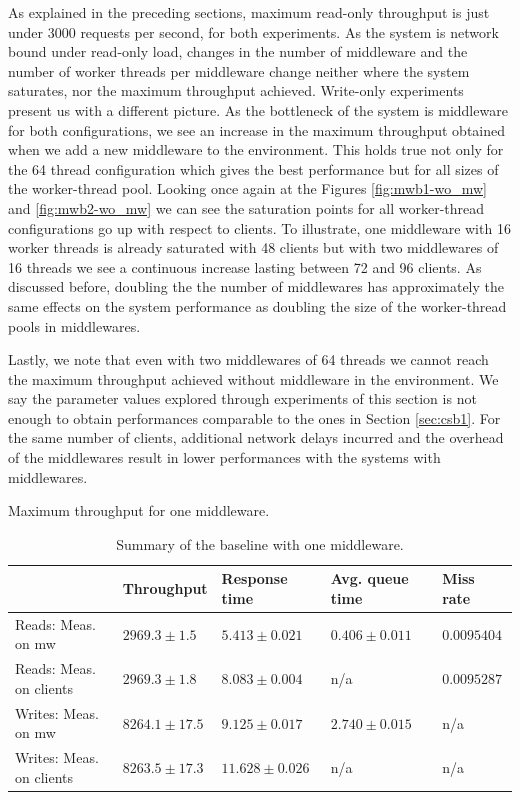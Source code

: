 \documentclass[11pt,a4paper]{article}
\begin{document}
\par As explained in the preceding sections, maximum read-only throughput is just under 3000 requests per second, for both experiments. As the system is network bound under read-only load, changes in the number of middleware and the number of worker threads per middleware change neither where the system saturates, nor the maximum throughput achieved. Write-only experiments present us with a different picture. As the bottleneck of the system is middleware for both configurations, we see an increase in the maximum throughput obtained when we add a new middleware to the environment. This holds true not only for the 64 thread configuration which gives the best performance but for all sizes of the worker-thread pool. Looking once again at the Figures \ref{fig:mwb1-wo_mw} and \ref{fig:mwb2-wo_mw} we can see the saturation points for all worker-thread configurations go up with respect to clients. To illustrate, one middleware with 16 worker threads is already saturated with 48 clients but with two middlewares of 16 threads we see a continuous increase lasting between 72 and 96 clients. As discussed before, doubling the the number of middlewares has approximately the same effects on the system performance as doubling the size of the worker-thread pools in middlewares.
\par Lastly, we note that even with two middlewares of 64 threads we cannot reach the maximum throughput achieved without middleware in the environment. We say the parameter values explored through experiments of this section is not enough to obtain performances comparable to the ones in Section \ref{sec:csb1}. For the same number of clients, additional network delays incurred and the overhead of the middlewares result in lower performances with the systems with middlewares.

\begin{table}[h]
\centering
{Maximum throughput for one middleware.}
\begin{tabular}{|l|p{2.3cm}|p{2.3cm}|p{2.7cm}|p{2.3cm}|}
\hline                       & Throughput        & {\small Response time}      & {\small Avg. queue time} & Miss rate \\ 
\hline Reads: Meas. on mw       & $2969.3 \pm 1.5$  & $5.413 \pm 0.021$  & $0.406 \pm 0.011$  & $0.0095404$ \\ 
\hline Reads: Meas. on clients  & $2969.3 \pm 1.8$  & $8.083 \pm 0.004$  & n/a                & $0.0095287$ \\ 
\hline Writes: Meas. on mw      & $8264.1 \pm 17.5$ & $9.125 \pm 0.017$  & $2.740 \pm 0.015$  & n/a \\ 
\hline Writes: Meas. on clients & $8263.5 \pm 17.3$ & $11.628 \pm 0.026$ & n/a                & n/a \\ 
\hline 
\end{tabular}
\caption{Summary of the baseline with one middleware.} \label{tab:mwb1-summary}
\end{table}
\end{document}
